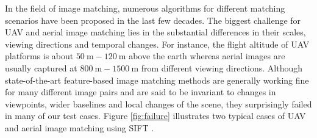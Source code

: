 

In the field of image matching, numerous algorithms for different matching scenarios have been proposed in the last few decades.
The biggest challenge for UAV and aerial image matching lies in the substantial differences in their scales, viewing directions and temporal changes. 
For instance, the flight altitude of UAV platforms is about $\SI{50}{\m} - \SI{120}{\m}$ above the earth whereas aerial images are usually captured at $\SI{800}{\m} - \SI{1500}{\m}$ from different viewing directions. 
Although state-of-the-art feature-based image matching methods are generally working fine for many different image pairs and are said to be invariant to changes in viewpoints, wider baselines and local changes of the scene, they surprisingly failed in many of our test cases. 
Figure \ref{fig:failure} illustrates two typical cases of UAV and aerial image matching using SIFT \cite{lowe2004distinctive}.

